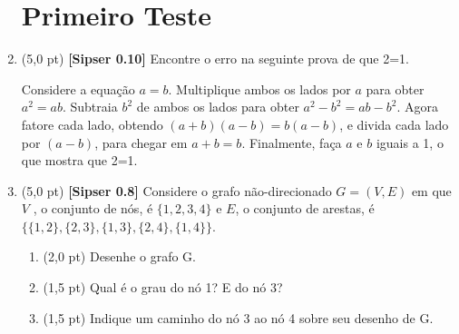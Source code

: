 \documentclass[12pt,a4paper,oneside]{article}
\begin{document}
\begin{enumerate}
	
	\section*{Primeiro Teste}
	
	\item (5,0 pt) {\bf [Sipser 0.10]} Encontre o erro na seguinte prova de que 2=1.
	\begin{flushleft}
		Considere a equação $a=b$. Multiplique ambos os lados por $a$ para obter $a^2 = ab$. Subtraia $b^2$ de ambos os lados para obter $a^2 - b^2 = ab-b^2$. Agora fatore cada lado, obtendo $(a+b)(a-b) = b(a-b)$, e divida cada lado por $(a-b)$, para chegar em $a+b = b$. Finalmente, faça $a$ e $b$ iguais a 1, o que mostra que 2=1.
	\end{flushleft}
	
	
	\item (5,0 pt) {\bf [Sipser 0.8]} Considere o grafo não-direcionado $G = (V, E)$ em que $V$ , o conjunto de nós, é $\{1, 2, 3, 4\}$ e $E$, o conjunto de arestas, é $\{\{1, 2\}, \{2, 3\}, \{1, 3\}, \{2, 4\}, \{1, 4\}\}$.
	\begin{enumerate}
		\item (2,0 pt) Desenhe o grafo G. 
		\item (1,5 pt) Qual é o grau do nó 1? E do nó 3? 
		\item (1,5 pt) Indique um caminho do nó 3 ao nó 4 sobre seu desenho de G.
	\end{enumerate}

\end{enumerate}
\end{document}
